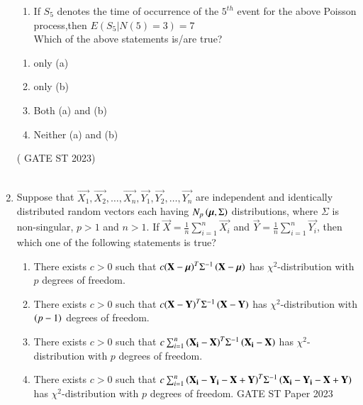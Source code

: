 \begin{enumerate}[label=\thechapter.\arabic*,ref=\thechapter.\theenumi]
\begin{enumerate}[label=(\alph*)]
\item If $S_5$ denotes the time of occurrence of the $5^{th}$ event for the above Poisson process,then $E(S_5|N(5)=3)=7$ \\
Which of the above statements is/are true?\\
\end{enumerate}
\begin{enumerate}[label=(\roman*)]
\item only (a)
\item only (b)
\item Both (a) and (b)
\item Neither (a) and (b)
\end{enumerate}
\hfill ( GATE ST 2023)\\
\solution \\

\item Suppose that $\vec{X_1}, \vec{X_2},\ldots, \vec{X_n}, \vec{Y_1}, \vec{Y_2},\ldots, \vec{Y_n}$ are independent and identically distributed random vectors each having $N_p\left(\bm{\mu},\Sigma\right)$ distributions, where $\Sigma$ is non-singular, $p>1$ and $n>1$. If $\vec{X} = \frac{1}{n}\sum_{i=1}^{n}\vec{X_i}$ and $\vec{Y} = \frac{1}{n}\sum_{i=1}^{n}\vec{Y_i}$, then which one of the following statements is true?
\begin{enumerate}[label=(\alph*)]
\item There exists $c>0$ such that $c{\left(\mathbf{X}-\bm{\mu}\right)}^T{\Sigma}^{-1}\left(\mathbf{X}-\bm{\mu}\right)$ has ${\chi}^2$-distribution with $p$ degrees of freedom.
\item There exists $c>0$ such that $c{\left(\mathbf{X}-\mathbf{Y}\right)^T}{\Sigma}^{-1}\left(\mathbf{X}-\mathbf{Y}\right)$ has ${\chi}^2$-distribution with $\left(p-1\right)$ degrees of freedom.
\item There exists $c>0$ such that $c\sum_{i=1}^n{\left(\mathbf{X_i}-\mathbf{X}\right)}^T{\Sigma}^{-1}\left(\mathbf{X_i}-\mathbf{X}\right)$ has ${\chi}^2$-distribution with $p$ degrees of freedom.
\item There exists $c>0$ such that $c\sum_{i=1}^n{\left(\mathbf{X_i}-\mathbf{Y_i}-\mathbf{X}+\mathbf{Y}\right)}^T{\Sigma}^{-1}\left(\mathbf{X_i}-\mathbf{Y_i}-\mathbf{X}+\mathbf{Y}\right)$ has ${\chi}^2$-distribution with $p$ degrees of freedom.   \hfill{GATE ST Paper 2023} 
\end{enumerate} 

\end{enumerate}
